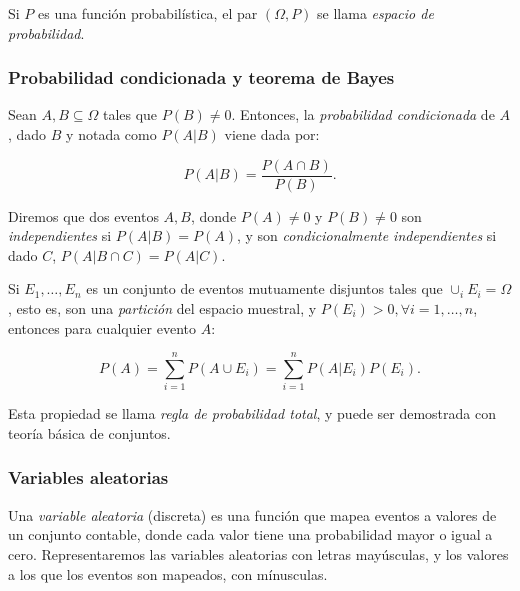 Si $P$ es una función probabilística, el par $(\Omega, P)$ se llama {\em espacio de probabilidad}.

\subsubsection{Probabilidad condicionada y teorema de Bayes}\label{condi}

Sean $A, B \subseteq \Omega$ tales que $P(B) \neq 0$. Entonces, la {\em probabilidad condicionada} de $A$, 
dado $B$ y notada como $P(A|B)$ viene dada por:

$$P(A|B) = \frac{P(A \cap B)}{P(B)}.$$

Diremos que dos eventos $A,B$, donde $P(A) \neq 0$ y $P(B) \neq 0$ son {\em independientes} si $P(A|B) = P(A)$, 
y son {\em condicionalmente independientes} si dado $C$, $P(A|B \cap C) = P(A|C)$.

Si $E_1, \dots, E_n$ es un conjunto de eventos mutuamente disjuntos tales que $\cup_i E_i = \Omega$, esto es, 
son una {\em partición} del espacio muestral, y $P(E_i) > 0, \forall i = 1, \dots, n$, entonces para cualquier 
evento $A$: 

\begin{equation}
P(A) = \sum_{i=1}^n P(A \cup E_i) = \sum_{i=1}^n P(A|E_i)P(E_i). 
\label{lawoftotalprobability}
\end{equation}

Esta propiedad se llama {\em regla de probabilidad total}, y puede ser demostrada con teoría básica de conjuntos.



\subsubsection{Variables aleatorias}

Una {\em variable aleatoria} (discreta) es una función que mapea eventos a valores de un conjunto contable, donde 
cada valor tiene una probabilidad mayor o igual a cero. Representaremos las variables aleatorias con letras 
mayúsculas, y los valores a los que los eventos son mapeados, con mínusculas. 

